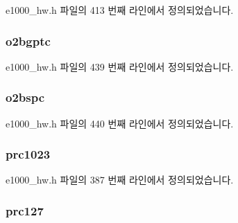 e1000\+\_\+hw.\+h 파일의 413 번째 라인에서 정의되었습니다.

\subsubsection[{\texorpdfstring{o2bgptc}{o2bgptc}}]{ o2bgptc}\hypertarget{structe1000__hw__stats_a2464d5099c45372f716e0e63eeab3b41}{}\label{structe1000__hw__stats_a2464d5099c45372f716e0e63eeab3b41}


e1000\+\_\+hw.\+h 파일의 439 번째 라인에서 정의되었습니다.

\subsubsection[{\texorpdfstring{o2bspc}{o2bspc}}]{ o2bspc}\hypertarget{structe1000__hw__stats_a2269d54a46832c5a3d56f5425e18d02d}{}\label{structe1000__hw__stats_a2269d54a46832c5a3d56f5425e18d02d}


e1000\+\_\+hw.\+h 파일의 440 번째 라인에서 정의되었습니다.

\subsubsection[{\texorpdfstring{prc1023}{prc1023}}]{ prc1023}\hypertarget{structe1000__hw__stats_a44ba9d37bbb3ffa8453819228ada5925}{}\label{structe1000__hw__stats_a44ba9d37bbb3ffa8453819228ada5925}


e1000\+\_\+hw.\+h 파일의 387 번째 라인에서 정의되었습니다.

\subsubsection[{\texorpdfstring{prc127}{prc127}}]{ prc127}\hypertarget{structe1000__hw__stats_a797652b7fe3d98c0801a47b1f3bf64b0}{}\label{structe1000__hw__stats_a797652b7fe3d98c0801a47b1f3bf64b0}


